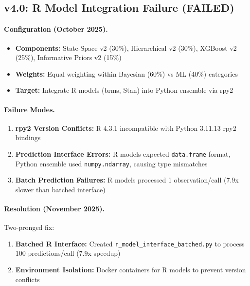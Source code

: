 \subsection{v4.0: R Model Integration Failure (FAILED)}

\paragraph{Configuration (October 2025).}
\begin{itemize}[itemsep=2pt,parsep=0pt]
    \item \textbf{Components:} State-Space v2 (30\%), Hierarchical v2 (30\%), XGBoost v2 (25\%), Informative Priors v2 (15\%)
    \item \textbf{Weights:} Equal weighting within Bayesian (60\%) vs ML (40\%) categories
    \item \textbf{Target:} Integrate R models (brms, Stan) into Python ensemble via rpy2
\end{itemize}

\paragraph{Failure Modes.}
\begin{enumerate}[itemsep=2pt,parsep=0pt]
    \item \textbf{rpy2 Version Conflicts:} R 4.3.1 incompatible with Python 3.11.13 rpy2 bindings
    \item \textbf{Prediction Interface Errors:} R models expected \texttt{data.frame} format, Python ensemble used \texttt{numpy.ndarray}, causing type mismatches
    \item \textbf{Batch Prediction Failures:} R models processed 1 observation/call (7.9x slower than batched interface)
\end{enumerate}

\paragraph{Resolution (November 2025).}
Two-pronged fix:
\begin{enumerate}[itemsep=2pt,parsep=0pt]
    \item \textbf{Batched R Interface:} Created \texttt{r\_model\_interface\_batched.py} to process 100 predictions/call (7.9x speedup)
    \item \textbf{Environment Isolation:} Docker containers for R models to prevent version conflicts
\end{enumerate}

